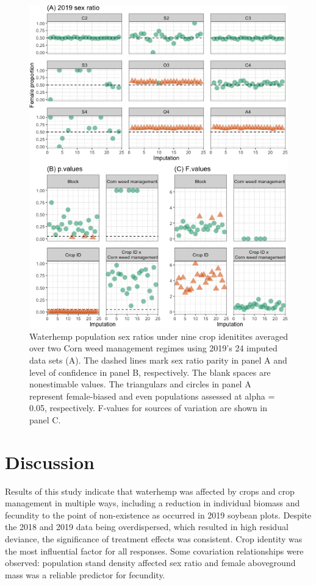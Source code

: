 \documentclass[
]{article}
\begin{document}
\begin{figure}[H]
\includegraphics[width=1\linewidth]{Manuscript_whole_files/figure-latex/sexr19-arrow-1} \caption{Waterhemp population sex ratios under nine crop idenitites averaged over two Corn weed management regimes using 2019's 24 imputed data sets (A). The dashed lines mark sex ratio parity in panel A and level of confidence in panel B, respectively. The blank spaces are nonestimable values. The triangulars and circles in panel A represent female-biased and even populations assessed at alpha = 0.05, respectively. F-values for sources of variation are shown in panel C.}\label{fig:sexr19-arrow}
\end{figure}

\hypertarget{discussion}{%
\section*{Discussion}\label{discussion}}

Results of this study indicate that waterhemp was affected by crops and crop management in multiple ways, including a reduction in individual biomass and fecundity to the point of non-existence as occurred in 2019 soybean plots.
Despite the 2018 and 2019 data being overdispersed, which resulted in high residual deviance, the significance of treatment effects was consistent. Crop identity was the most influential factor for all responses. Some covariation relationships were observed: population stand density affected sex ratio and female aboveground mass was a reliable predictor for fecundity.
\end{document}
